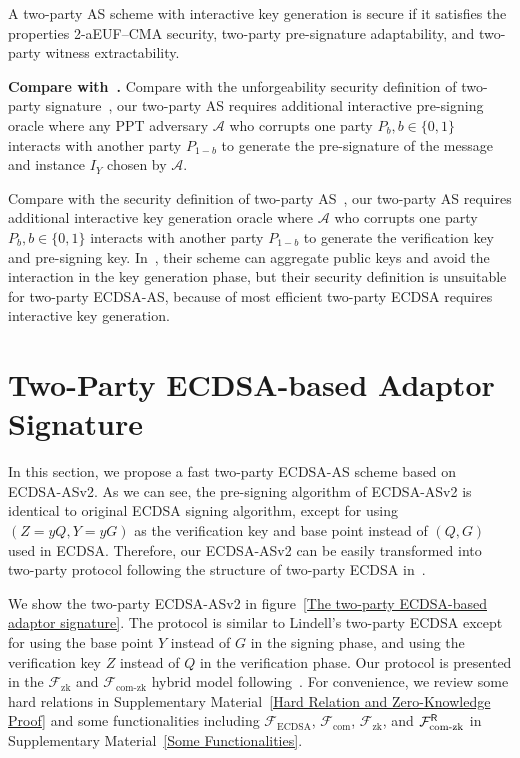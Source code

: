 \documentclass{llncs}
\begin{document}
A two-party AS scheme with interactive key generation is secure if it satisfies the properties 2-aEUF–CMA security, two-party pre-signature adaptability, and two-party witness extractability.


\begin{trivlist}
\item \textbf{Compare with~\cite{Lin17,ErwigFHM021}.} Compare with the unforgeability security definition of two-party signature~\cite{Lin17}, our two-party AS requires additional interactive pre-signing oracle where any PPT adversary $\mathcal{A}$ who corrupts one party $P_{b},b\in\{0,1\}$ interacts with another party $P_{1-b}$ to generate the pre-signature of the message and instance $I_Y$ chosen by $\mathcal{A}$. 

Compare with the security definition of two-party AS~\cite{ErwigFHM021}, our two-party AS requires additional interactive key generation oracle where $\mathcal{A}$ who corrupts one party $P_{b},b\in\{0,1\}$ interacts with another party $P_{1-b}$ to generate the verification key and pre-signing key. In~\cite{ErwigFHM021}, their scheme can aggregate public keys and avoid the interaction in the key generation phase, but their security definition is unsuitable for two-party ECDSA-AS, because of most efficient two-party ECDSA requires interactive key generation.
\end{trivlist}



\section{Two-Party ECDSA-based Adaptor Signature}

In this section, we propose a fast two-party ECDSA-AS scheme based on ECDSA-ASv2. As we can see, the pre-signing algorithm of ECDSA-ASv2 is identical to original ECDSA signing algorithm, except for using $(Z=yQ,Y=yG)$ as the verification key and base point instead of $(Q,G)$ used in ECDSA. Therefore, our ECDSA-ASv2 can be easily transformed into two-party protocol following the structure of two-party ECDSA in~\cite{Lin17}. 

We show the two-party ECDSA-ASv2 in figure~\ref{The two-party ECDSA-based adaptor signature}. The protocol is similar to Lindell's two-party ECDSA except for using the base point $Y$ instead of $G$ in the signing phase, and using the verification key $Z$ instead of $Q$ in the verification phase. Our protocol is presented in the $\mathcal{F}_{\text{zk}}$ and $\mathcal{F}_{\text{com-zk}}$ hybrid model following~\cite{Lin17}. For convenience, we review some hard relations in Supplementary Material~\ref{Hard Relation and Zero-Knowledge Proof} and some functionalities including $\mathcal{F}_{\text{ECDSA}}$, $\mathcal{F}_{\text{com}}$, $\mathcal{F}_{\text{zk}}$, and $\mathcal{F}^\mathsf{R}_{\text{com\text{-}zk}}$ in Supplementary Material~\ref{Some Functionalities}.
\end{document}
